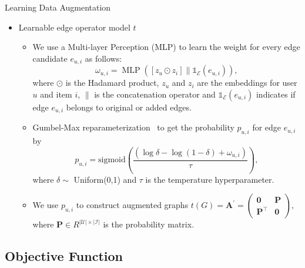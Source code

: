 \documentclass[t]{beamer}
\begin{document}
\begin{frame}{Learning Data Augmentation}
\begin{itemize}
    \item Learnable edge operator model $t$ 
    \begin{itemize}
        \item We use a Multi-layer Perception (MLP) to learn the weight for every edge candidate $e_{u,i}$ as follows:
\begin{equation*}
    \omega_{u,i}=\operatorname{MLP}\left(\left[z_{u} \odot z_{i}\right] \|  \mathds{1}_{\mathcal{E}}(e_{u,i}) \right),
\end{equation*}
where $\odot$ is the Hadamard product, $z_u$ and $z_i$ are the embeddings for user $u$ and item $i$, $\|$ is the concatenation operator and $\mathds{1}_{\mathcal{E}}(e_{u,i})$ indicates if edge $e_{u,i}$ belongs to original or added edges.
        \item Gumbel-Max reparameterization~ to get the probability $p_{u,i}$ for edge $e_{u,i}$ by
\begin{equation*}
    \label{eq:p_ui}
    p_{u,i} = \mathrm{sigmoid}(\frac{(\log\delta - \log(1-\delta) + \omega_{u,i})}{\tau}),
\end{equation*}
where $\delta \sim$ Uniform(0,1) and $\tau$ is the temperature hyperparameter. 
        \item We use $p_{u,i}$ to construct augmented graphs
$
t(G)= \mathbf{A}^{\prime} = \left(\begin{array}{cc} \mathbf{0} & \mathbf{P} \\ \mathbf{P}^{\top} & \mathbf{0}\end{array}\right),
$
where $\mathbf{P}\in R^{|\mathcal{U}|\times |\mathcal{I}|}$ is the probability matrix.
        
    \end{itemize}
\end{itemize}

\end{frame}


\subsection{Objective Function} 
\label{sec:loss_function}
\end{document}
